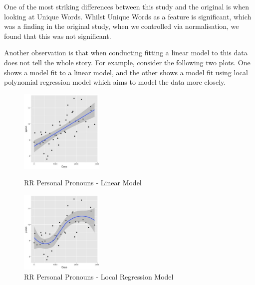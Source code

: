 \documentclass[12pt]{article}
\begin{document}
One of the most striking differences between this study and the original is when looking at Unique Words. Whilst Unique Words as a feature is significant, which was a finding in the original study, when we controlled via normalisation, we found that this was not significant. 
\par
Another observation is that when conducting fitting a linear model to this data does not tell the whole story. For example, consider the following two plots. One shows a model fit to a linear  model, and the other shows a model fit using local polynomial regression model which aims to model the data more closely. 

\begin{figure}[b]
	\centering
	\begin{minipage}[b]{0.4\textwidth}
		\includegraphics[width=150px, height=150px,  natwidth=300, natheight=300]{RRppronLM.jpg}
		\caption{RR Personal Pronouns - Linear Model}
	\end{minipage}		
	
	\begin{minipage}[b]{0.4\textwidth}
		\includegraphics[width=150px, height=150px, natwidth=300, natheight=300]{RRppronLOESS.jpg}
		\caption{RR Personal Pronouns - Local Regression Model}
	\end{minipage}		
\end{figure}
 
\end{document}
